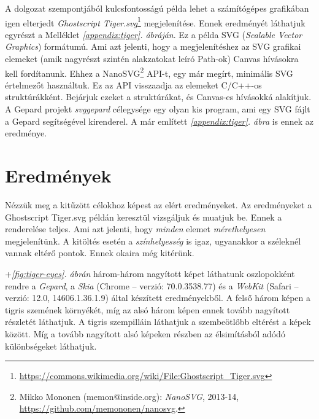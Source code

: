 \documentclass[12pt]{report}
\theoremstyle{definition}
\newcommand{\inenglish}[1]{\textsl{#1}}
\newcommand{\func}[1]{{\textsl{#1}}}
\begin{document}
A dolgozat szempontjából kulcsfontosságú példa lehet a számítógépes grafikában
igen elterjedt \func{Ghostscript Tiger.svg}\footnote{ {\footnotesize
\url{https://commons.wikimedia.org/wiki/File:Ghostscript_Tiger.svg}}}
megjelenítése. Ennek eredményét láthatjuk egyrészt a Melléklet
\emph{\ref{appendix:tiger}. ábráján}. Ez a példa SVG (\inenglish{Scalable
Vector Graphics}) formátumú. Ami azt jelenti, hogy a megjelenítéshez az SVG
grafikai elemeket (amik nagyrészt szintén alakzatokat leíró Path-ok) Canvas
hívásokra kell fordítanunk. Ehhez a NanoSVG\footnote{Mikko Mononen
(memon@inside.org): \emph{NanoSVG}, 2013-14, \\
{\footnotesize\url{https://github.com/memononen/nanosvg}}.} API-t, egy már
megírt, minimális SVG értelmezőt használtuk. Ez az API visszaadja az elemeket
C/C++-os struktúrákként. Bejárjuk ezeket a struktúrákat, és Canvas-es hívásokká
alakítjuk. A Gepard projekt \func{svggepard} célegysége egy olyan kis program,
ami egy SVG fájlt a Gepard segítségével kirenderel. A már említett
\emph{\ref{appendix:tiger}. ábra} is ennek az eredménye.

    \section{Eredmények}
    \label{sec:Eredmények}

Nézzük meg a kitűzött célokhoz képest az elért eredményeket. Az eredményeket a
Ghostscript Tiger.svg példán keresztül vizsgáljuk és muatjuk be. Ennek a
renderelése teljes. Ami azt jelenti, hogy \emph{minden} elemet
\emph{mérethelyesen} megjelenítünk. A kitöltés esetén a \emph{színhelyesség} is
igaz, ugyanakkor a széleknél vannak eltérő pontok. Ennek okaira még kitérünk.

\Az+\emph{\ref{fig:tiger-eyes}. ábrán} három-három nagyított képet láthatunk
oszlopokként rendre a \emph{Gepard}, a \emph{Skia} (Chrome -- verzió:
70.0.3538.77) és a \emph{WebKit} (Safari -- verzió: 12.0, 14606.1.36.1.9) által
készített eredményekből. A felső három képen a tigris szemének környékét, míg
az alsó három képen ennek tovább nagyított részletét láthatjuk. A tigris
szempilláin láthatjuk a szembeötlőbb eltérést a képek között. Míg a tovább
nagyított alsó képeken részben az élsimításból adódó különbségeket láthatjuk.
\end{document}
